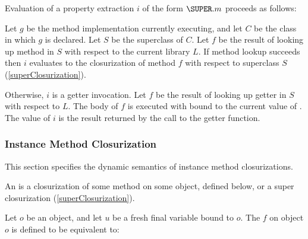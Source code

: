 \documentclass[makeidx]{article}
\begin{document}
{

\LMHash{}%
Evaluation of a property extraction $i$ of the form $\SUPER.m$
proceeds as follows:

\LMHash{}%
Let $g$ be the method implementation currently executing,
and let $C$ be the class in which $g$ is declared.
Let $S$ be the superclass of $C$.
Let $f$ be the result of looking up method \id{} in $S$
with respect to the current library $L$.
If method lookup succeeds then $i$ evaluates to
the closurization of method $f$
with respect to superclass $S$
(\ref{superClosurization}).

\LMHash{}%
Otherwise, $i$ is a getter invocation.
Let $f$ be the result of looking up
getter \id{} in $S$ with respect to $L$.
The body of $f$ is executed with \THIS{} bound to the current value of \THIS.
The value of $i$ is the result returned by the call to the getter function.



\subsubsection{Instance Method Closurization}

\LMHash{}%
This section specifies the dynamic semantics of instance method closurizations.


\LMHash{}%
An 
is a closurization of some method on some object, defined below,
or a super closurization (\ref{superClosurization}).

\LMHash{}%
Let $o$ be an object, and let $u$ be a fresh final variable bound to $o$.
The  $f$ on object $o$
is defined to be equivalent
to:

}
\end{document}
